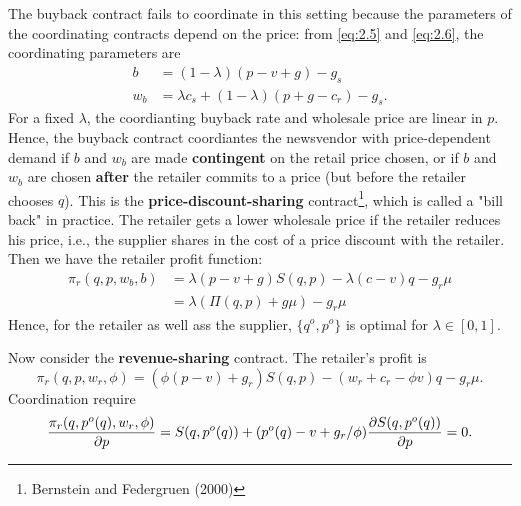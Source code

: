 The buyback contract fails to coordinate in this setting because the parameters of the coordinating contracts depend on the price: from \autoref{eq:2.5} and \autoref{eq:2.6}, the coordinating parameters are
\begin{align*}
    b&=(1-\lambda)(p-v+g)-g_s\\
    w_b&=\lambda c_s+(1-\lambda)(p+g-c_r)-g_s.
\end{align*}
For a fixed $\lambda$, the coordianting buyback rate and wholesale price are linear in $p$. Hence, the buyback contract coordiantes the newsvendor with price-dependent demand if $b$ and $w_b$ are made \textbf{contingent} on the retail price chosen, or if $b$ and $w_b$ are chosen \textbf{after} the retailer commits to a price (but before the retailer chooses $q$). This is the \textbf{price-discount-sharing} contract\footnote{Bernstein and Federgruen (2000)}, which is called a "bill back" in practice. The retailer gets a lower wholesale price if the retailer reduces his price, i.e., the supplier shares in the cost of a price discount with the retailer. Then we have the retailer profit function:
\begin{align*}
    \pi_r(q,p,w_b,b)&=\lambda(p-v+g)S(q,p)-\lambda(c-v)q-g_r\mu\\
    &=\lambda(\Pi(q,p)+g\mu)-g_r\mu
\end{align*}
Hence, for the retailer as well ass the supplier, $\{q^o,p^o\}$ is optimal for $\lambda\in[0,1]$.

Now consider the \textbf{revenue-sharing} contract. The retailer's profit is 
\begin{equation*}
    \pi_r(q,p,w_r,\phi)=(\phi(p-v)+g_r)S(q,p)-(w_r+c_r-\phi v)q-g_r\mu.
\end{equation*}
Coordination require
\begin{equation}\label{eq:3.4}
    \frac{\pi_r(q,p^o(q),w_r,\phi)}{\partial p}=S(q,p^o(q))+(p^o(q)-v+g_r/\phi)\frac{\partial S(q,p^o(q))}{\partial p}=0.
\end{equation}

